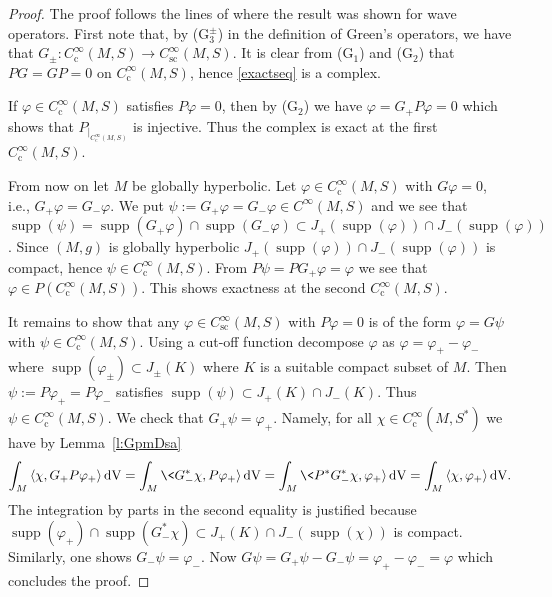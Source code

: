 \documentclass[a4paper,11pt]{amsart}
\theoremstyle{definition}
\begin{document}
\begin{proof}
The proof follows the lines of \cite[Thm.~3.4.7]{BGP} where the result was shown for wave operators.
First note that, by (G$_3^\pm$) in the definition of Green's operators, we have that $G_\pm : {C^\infty_\mathrm{c}}(M,S) \to {C^\infty_\mathrm{sc}}(M,S)$.
It is clear from (G$_1$) and (G$_2$) that $PG=GP=0$ on ${C^\infty_\mathrm{c}}(M,S)$, hence \eqref{exactseq} is a complex.

If ${\varphi}\in{C^\infty_\mathrm{c}}(M,S)$ satisfies $P{\varphi}=0$, then by (G$_2$) we have ${\varphi}=G_+P{\varphi}=0$ which shows that $P_{|_{{C^\infty_\mathrm{c}}(M,S)}}$ is injective.
Thus the complex is exact at the first ${C^\infty_\mathrm{c}}(M,S)$.

From now on let $M$ be globally hyperbolic.
Let ${\varphi}\in{C^\infty_\mathrm{c}}(M,S)$ with $G{\varphi}=0$, i.e., $G_+{\varphi}=G_-{\varphi}$. 
We put $\psi:=G_+{\varphi}=G_-{\varphi} \in {C^\infty}(M,S)$ and we see that
${\operatorname{supp}}(\psi)={\operatorname{supp}}(G_+{\varphi})\cap{\operatorname{supp}}(G_-{\varphi})\subset J_+({\operatorname{supp}}({\varphi}))\cap 
J_-({\operatorname{supp}}({\varphi}))$.
Since $(M,g)$ is globally hyperbolic $J_+({\operatorname{supp}}({\varphi}))\cap
J_-({\operatorname{supp}}({\varphi}))$ is compact, hence $\psi\in {C^\infty_\mathrm{c}}(M,S)$.
From $P\psi = PG_+{\varphi} = {\varphi}$ we see that ${\varphi}\in P({C^\infty_\mathrm{c}}(M,S))$.
This shows exactness at the second ${C^\infty_\mathrm{c}}(M,S)$.

It remains to show that any ${\varphi}\in {C^\infty_\mathrm{sc}}(M,S)$ with $P{\varphi}=0$ is of the form ${\varphi}=G\psi$ with $\psi\in {C^\infty_\mathrm{c}}(M,S)$.
Using a cut-off function decompose ${\varphi}$ as ${\varphi}={\varphi}_+-{\varphi}_-$ where ${\operatorname{supp}}({\varphi}_\pm) \subset J_\pm(K)$ where $K$ is a suitable compact subset of $M$.
Then $\psi:=P{\varphi}_+=P{\varphi}_-$ satisfies ${\operatorname{supp}}(\psi)\subset J_+(K)\cap J_-(K)$.
Thus $\psi\in {C^\infty_\mathrm{c}}(M,S)$.
We check that $G_+\psi={\varphi}_+$.
Namely, for all $\chi\in{C^\infty_\mathrm{c}}(M,S^*)$ we have by Lemma~\ref{l:GpmDsa}
$$
\int_M {\langle}\chi,G_+P{\varphi}_+{\rangle} {\,\mathrm{dV}} =
\int_M \<G_-^{*}\chi,P{\varphi}_+{\rangle} {\,\mathrm{dV}} =
\int_M \<P^*G_-^{*}\chi,{\varphi}_+{\rangle} {\,\mathrm{dV}} =
\int_M {\langle}\chi,{\varphi}_+{\rangle} {\,\mathrm{dV}} .
$$
The integration by parts in the second equality is justified because ${\operatorname{supp}}({\varphi}_+) \cap {\operatorname{supp}}(G^*_-\chi) \subset J_+(K)\cap J_-({\operatorname{supp}}(\chi))$ is compact.
Similarly, one shows $G_-\psi={\varphi}_-$.
Now $G\psi = G_+\psi - G_-\psi = {\varphi}_+ - {\varphi}_- = {\varphi}$ which concludes the proof. 
\end{proof}
\end{document}
